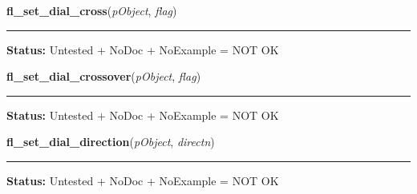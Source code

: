     \label{xformslib:library:fl_set_dial_cross}

    \vspace{0.5ex}

\hspace{.8\funcindent}\begin{boxedminipage}{\funcwidth}

    \raggedright \textbf{fl\_set\_dial\_cross}(\textit{pObject}, \textit{flag})

    \vspace{-1.5ex}

    \rule{\textwidth}{0.5\fboxrule}
\setlength{\parskip}{2ex}
\setlength{\parskip}{1ex}
\textbf{Status:} Untested + NoDoc + NoExample = NOT OK



    \end{boxedminipage}

    \label{xformslib:library:fl_set_dial_cross}

    \vspace{0.5ex}

\hspace{.8\funcindent}\begin{boxedminipage}{\funcwidth}

    \raggedright \textbf{fl\_set\_dial\_crossover}(\textit{pObject}, \textit{flag})

    \vspace{-1.5ex}

    \rule{\textwidth}{0.5\fboxrule}
\setlength{\parskip}{2ex}
\setlength{\parskip}{1ex}
\textbf{Status:} Untested + NoDoc + NoExample = NOT OK



    \end{boxedminipage}

    \label{xformslib:library:fl_set_dial_direction}

    \vspace{0.5ex}

\hspace{.8\funcindent}\begin{boxedminipage}{\funcwidth}

    \raggedright \textbf{fl\_set\_dial\_direction}(\textit{pObject}, \textit{directn})

    \vspace{-1.5ex}

    \rule{\textwidth}{0.5\fboxrule}
\setlength{\parskip}{2ex}
\setlength{\parskip}{1ex}
\textbf{Status:} Untested + NoDoc + NoExample = NOT OK



    \end{boxedminipage}

